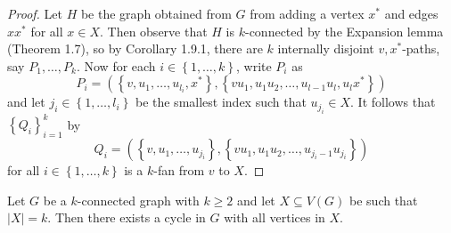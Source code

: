 \documentclass[co342]{subfiles}
\begin{document}
    \begin{proof}
        Let $H$ be the graph obtained from $G$ from adding a vertex $x^{*}$ and edges $xx^{*}$ for all $x\in X$. Then observe that $H$ is $k$-connected by the Expansion lemma (Theorem 1.7), so by Corollary 1.9.1, there are $k$ internally disjoint $v,x^{*}$-paths, say $P_1,\ldots,P_k$. Now for each $i\in\left\lbrace 1,\ldots,k \right\rbrace$, write $P_i$ as
        \begin{equation*}
            P_i = \left( \left\lbrace v,u_1,\ldots,u_{l_i},x^{*} \right\rbrace, \left\lbrace vu_1,u_1u_2,\ldots,u_{l-1}u_l,u_lx^{*} \right\rbrace \right)
        \end{equation*}
        and let $j_i\in\left\lbrace 1,\ldots,l_i \right\rbrace$ be the smallest index such that $u_{j_i}\in X$. It follows that $\left\lbrace Q_i \right\rbrace^{k}_{i=1}$ by
        \begin{equation*}
            Q_i = \left( \left\lbrace v,u_1,\ldots,u_{j_i} \right\rbrace, \left\lbrace vu_1,u_1u_2,\ldots,u_{j_i-1}u_{j_i} \right\rbrace \right)
        \end{equation*}
        for all $i\in\left\lbrace 1,\ldots,k \right\rbrace$ is a $k$-fan from $v$ to $X$.
    \end{proof}

    \begin{cor}{}
        Let $G$ be a $k$-connected graph with $k\geq 2$ and let $X\subseteq V\left( G \right)$ be such that $\left| X \right|=k$. Then there exists a cycle in $G$ with all vertices in $X$.
    \end{cor}	
\end{document}
